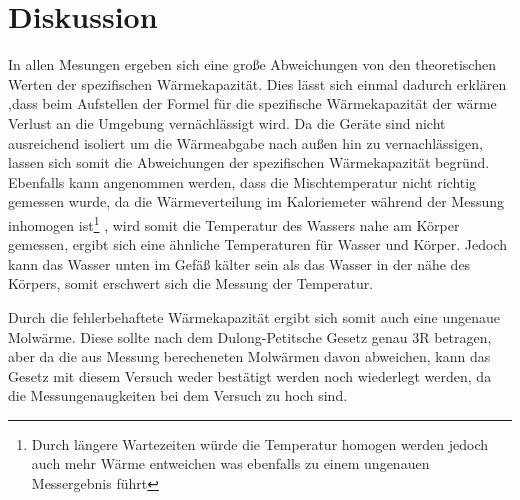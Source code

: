 \section{Diskussion}
\label{sec:Diskussion}
In allen Mesungen ergeben sich eine große Abweichungen von den theoretischen Werten der spezifischen Wärmekapazität.
Dies lässt sich einmal dadurch erklären ,dass beim Aufstellen der Formel für die spezifische Wärmekapazität der wärme Verlust an die Umgebung vernächlässigt wird.
Da die Geräte sind nicht ausreichend isoliert um die Wärmeabgabe nach außen hin zu vernachlässigen, lassen sich somit die
Abweichungen der spezifischen Wärmekapazität begründ.
Ebenfalls kann angenommen werden, dass die Mischtemperatur nicht richtig gemessen wurde, da
die Wärmeverteilung im Kaloriemeter während der Messung inhomogen ist\footnote{Durch längere Wartezeiten würde die Temperatur homogen werden jedoch
auch mehr Wärme entweichen was ebenfalls zu einem ungenauen Messergebnis führt} , wird somit die Temperatur des Wassers nahe am
Körper gemessen, ergibt sich eine ähnliche Temperaturen für Wasser und Körper.
Jedoch kann das Wasser unten im Gefäß kälter sein als das Wasser in der nähe des Körpers, somit erschwert sich die Messung der Temperatur.

Durch die fehlerbehaftete Wärmekapazität ergibt sich somit auch eine ungenaue Molwärme.
Diese sollte nach dem Dulong-Petitsche Gesetz genau 3R betragen, aber da die aus Messung
berecheneten Molwärmen davon abweichen, kann das Gesetz mit diesem Versuch weder
bestätigt werden noch  wiederlegt werden, da die Messungenaugkeiten bei dem Versuch zu hoch sind.    
